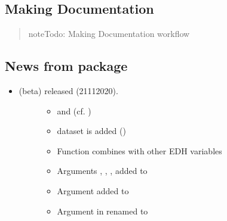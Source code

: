 \documentclass[a4paper,12pt,english]{sphinxhowto}
\begin{document}
\subsection{Making Documentation}
\label{\detokenize{sdam:making-documentation}}\begin{quote}

\begin{sphinxadmonition}{note}{\label{\detokenize{sdam:id5}}Todo:}
Making Documentation workflow
\end{sphinxadmonition}
\end{quote}



\subsection{News from  package}
\label{\detokenize{sdam:news-from-sdam-package}}\label{\detokenize{sdam:news}}\begin{itemize}
\item {} \begin{description}
\item[{ (beta) released (21\sphinxhyphen{}11\sphinxhyphen{}2020).}] \leavevmode\begin{itemize}
\item {} 
  and  (cf. )

\item {} 
 dataset is added ()

\end{itemize}
\begin{itemize}
\item {} 
Function  combines  with other EDH variables

\end{itemize}
\begin{itemize}
\item {} 
Arguments , , ,   added to 

\item {} 
Argument   added to 

\item {} 
Argument  in    renamed to 

\end{itemize}

\end{description}

\end{itemize}
\end{document}
